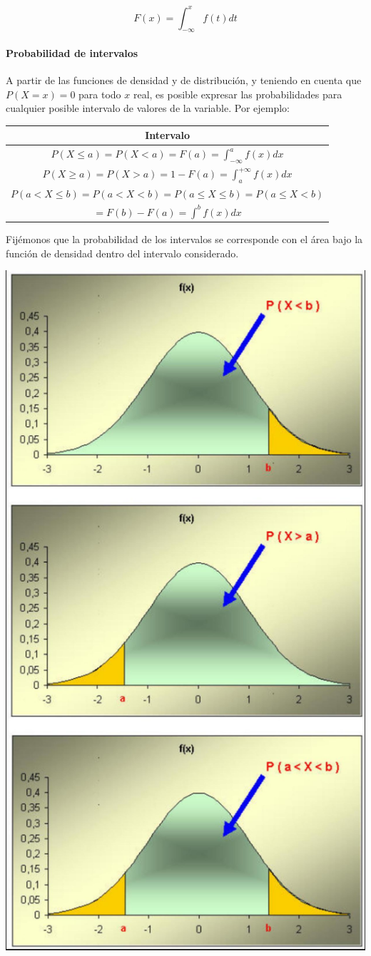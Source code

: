 \documentclass[
]{article}
\begin{document}
\[
F(x)=\int_{-\infty}^{x} f(t) d t
\]

\paragraph{Probabilidad de intervalos}\label{probabilidad-de-intervalos}

A partir de las funciones de densidad y de distribución, y teniendo en
cuenta que \(P(X=x)=0\) para todo \(x\) real, es posible expresar las
probabilidades para cualquier posible intervalo de valores de la
variable. Por ejemplo:

\begin{longtable}[]{@{}c@{}}
\toprule\noalign{}
Intervalo \\
\midrule\noalign{}
\endhead
\bottomrule\noalign{}
\endlastfoot
\(P(X \leq a)=P(X<a)=F(a)=\int_{-\infty}^{a} f(x) d x\) \\
\(P(X \geq a)=P(X>a)=1-F(a)=\int_{a}^{+\infty} f(x) d x\) \\
\(P(a<X \leq b)=P(a<X<b)=P(a \leq X \leq b)=P(a \leq X<b)\) \\
\(=F(b)-F(a)=\int^{b} f(x) d x\) \\
\end{longtable}

Fijémonos que la probabilidad de los intervalos se corresponde con el
área bajo la función de densidad dentro del intervalo considerado.

\includegraphics[width=0.8\linewidth]{images/probsDNormal}
\end{document}
